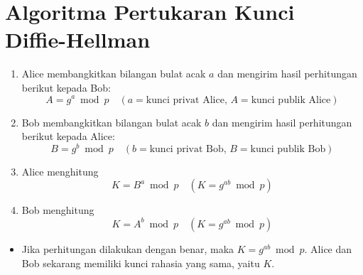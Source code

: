 \documentclass{article}
\begin{document}

\section*{Algoritma Pertukaran Kunci Diffie-Hellman}

\begin{enumerate}
  \item Alice membangkitkan bilangan bulat acak $a$ dan mengirim hasil perhitungan berikut kepada Bob:
  \[ A = g^a \bmod p \quad (a = \text{kunci privat Alice, } A = \text{kunci publik Alice}) \]
  \item Bob membangkitkan bilangan bulat acak $b$ dan mengirim hasil perhitungan berikut kepada Alice:
  \[ B = g^b \bmod p \quad (b = \text{kunci privat Bob, } B = \text{kunci publik Bob}) \]
  \item Alice menghitung
  \[ K = B^a \bmod p \quad (K = g^{ab} \bmod p) \]
  \item Bob menghitung
  \[ K = A^b \bmod p \quad (K = g^{ab} \bmod p) \]
\end{enumerate}

\begin{itemize}
  \item Jika perhitungan dilakukan dengan benar, maka $K = g^{ab} \bmod p$. Alice dan Bob sekarang memiliki kunci rahasia yang sama, yaitu $K$.
\end{itemize}
\end{document}
